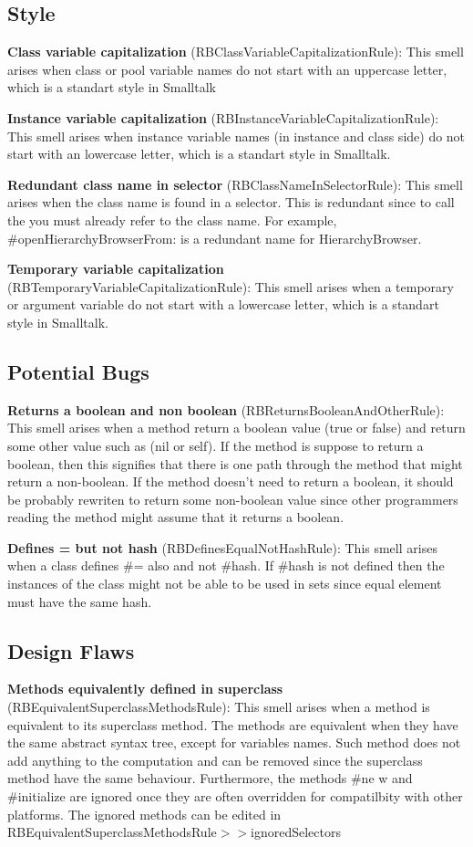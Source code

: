 \documentclass[a4paper,10pt,twoside]{book}
\begin{document}
% 

\subsection{Style}
\textbf{Class variable capitalization} (RBClassVariableCapitalizationRule): This smell arises when class or pool variable names do not start with an uppercase letter, which is a standart style in Smalltalk

\textbf{Instance variable capitalization} (RBInstanceVariableCapitalizationRule): This smell arises when instance variable names (in instance and class side) do not start with an lowercase letter, which is a standart style in Smalltalk.


\textbf{Redundant class name in selector} (RBClassNameInSelectorRule): This smell arises when the class name is found in a selector. This is redundant since to call the you must already refer to the class name. For example, \#openHierarchyBrowserFrom: is a redundant name for HierarchyBrowser.

\textbf{Temporary variable capitalization} (RBTemporaryVariableCapitalizationRule): This smell arises when a temporary or argument variable do not start with a lowercase letter, which is a standart style in Smalltalk.

\subsection{Potential Bugs}
\textbf{Returns a boolean and non boolean} (RBReturnsBooleanAndOtherRule): This smell arises when a method return a boolean value (true or false) and return some other value such as (nil or self). If the method is suppose to return a boolean, then this signifies that there is one path through the method that might return a non-boolean. If the method doesn't need to return a boolean, it should be probably rewriten to return some non-boolean value since other programmers reading the method might assume that it returns a boolean.

\textbf{Defines = but not hash} (RBDefinesEqualNotHashRule): This smell arises when a class defines \#= also and not \#hash. If \#hash is not defined then the instances of the class might not be able to be used in sets since equal element must have the same hash.

\subsection{Design Flaws}
\textbf{Methods equivalently defined in superclass} (RBEquivalentSuperclassMethodsRule): This smell arises when a method is equivalent to its superclass method. The methods are equivalent when they have the same abstract syntax tree, except for variables names. Such method does not add anything to the computation and can be removed since the superclass method have the same behaviour. Furthermore, the methods \#ne
w and \#initialize are ignored once they are often overridden for compatilbity with other platforms. The ignored methods can be edited in RBEquivalentSuperclassMethodsRule$>>$ignoredSelectors
\end{document}
